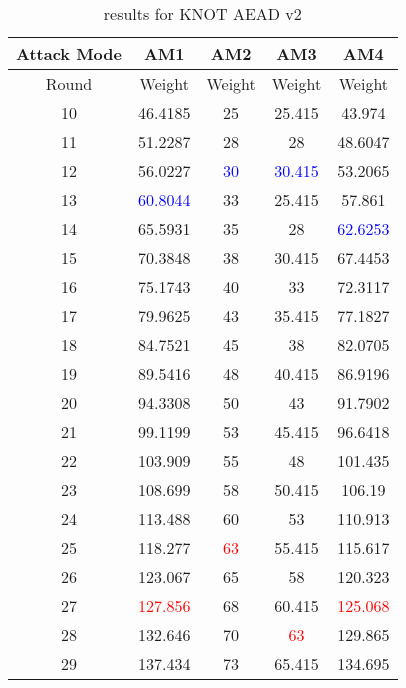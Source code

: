 \begin{table}
	\caption{results for KNOT AEAD v2}\label{tab:knot-aead-v2}
	\centering
	\begin{tabular}{|c|c|c|c|c|}
		\hline
		Attack Mode & AM1 & AM2 & AM3 & AM4\\
		\hline
		Round & Weight & Weight & Weight & Weight\\
		\hline
		10 & 46.4185 & 25 & 25.415 & 43.974\\
		11 & 51.2287 & 28 & 28 & 48.6047\\
		12 & 56.0227 & \textcolor{blue}{30} & \textcolor{blue}{30.415} & 53.2065\\
		13 & \textcolor{blue}{60.8044} & 33 & 25.415 & 57.861\\
		14 & 65.5931 & 35 & 28 & \textcolor{blue}{62.6253}\\
		15 & 70.3848 & 38 & 30.415 & 67.4453\\
		16 & 75.1743 & 40 & 33 & 72.3117\\
		17 & 79.9625 & 43 & 35.415 & 77.1827\\
		18 & 84.7521 & 45 & 38 & 82.0705\\
		19 & 89.5416 & 48 & 40.415 & 86.9196\\
		20 & 94.3308 & 50 & 43 & 91.7902\\
		21 & 99.1199 & 53 & 45.415 & 96.6418\\
		22 & 103.909 & 55 & 48 & 101.435\\
		23 & 108.699 & 58 & 50.415 & 106.19\\
		24 & 113.488 & 60 & 53 & 110.913\\
		25 & 118.277 & \textcolor{red}{63} & 55.415 & 115.617\\
		26 & 123.067 & 65 & 58 & 120.323\\
		27 & \textcolor{red}{127.856} & 68 & 60.415 & \textcolor{red}{125.068}\\
		28 & 132.646 & 70 & \textcolor{red}{63} & 129.865\\
		29 & 137.434 & 73 & 65.415 & 134.695\\
		\hline
	\end{tabular}
\end{table}

